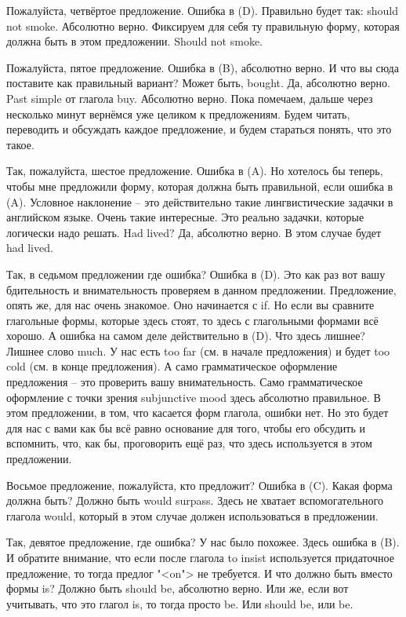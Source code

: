\documentclass[main.tex]{subfiles}
\begin{document}
Пожалуйста, четвёртое предложение.
Ошибка в (D).
Правильно будет так: should not smoke.
Абсолютно верно.
Фиксируем для себя ту правильную форму, которая должна быть в этом предложении.
Should not smoke.

Пожалуйста, пятое предложение.
Ошибка в (B), абсолютно верно.
И что вы сюда поставите как правильный вариант?
Может быть, bought.
Да, абсолютно верно.
Past simple от глагола buy.
Абсолютно верно.
Пока помечаем, дальше через несколько минут вернёмся уже целиком к предложениям.
Будем читать, переводить и обсуждать каждое предложение, и будем стараться понять, что это такое.

Так, пожалуйста, шестое предложение.
Ошибка в (A).
Но хотелось бы теперь, чтобы мне предложили форму, которая должна быть правильной, если ошибка в (A).
Условное наклонение -- это действительно такие лингвистические задачки в английском языке.
Очень такие интересные.
Это реально задачки, которые логически надо решать.
Had lived?
Да, абсолютно верно.
В этом случае будет had lived.

Так, в седьмом предложении где ошибка?
Ошибка в (D).
Это как раз вот вашу бдительность и внимательность проверяем в данном предложении.
Предложение, опять же, для нас очень знакомое.
Оно начинается с if.
Но если вы сравните глагольные формы, которые здесь стоят, то здесь с глагольными формами всё хорошо.
А ошибка на самом деле действительно в (D).
Что здесь лишнее?
Лишнее слово much.
У нас есть too far (см. в начале предложения) и будет too cold (см. в конце предложения).
А само грамматическое оформление предложения -- это проверить вашу внимательность.
Само грамматическое оформление с точки зрения subjunctive mood здесь абсолютно правильное.
В этом предложении, в том, что касается форм глагола, ошибки нет.
Но это будет для нас с вами как бы всё равно основание для того, чтобы его обсудить и вспомнить, что, как бы, проговорить ещё раз, что здесь используется в этом предложении.

Восьмое предложение, пожалуйста, кто предложит?
Ошибка в (C).
Какая форма должна быть?
Должно быть would surpass.
Здесь не хватает вспомогательного глагола would, который в этом случае должен использоваться в предложении.

Так, девятое предложение, где ошибка?
У нас было похожее.
Здесь ошибка в (B).
И обратите внимание, что если после глагола to insist используется придаточное предложение, то тогда предлог "<on"> не требуется.
И что должно быть вместо формы is?
Должно быть should be, абсолютно верно.
Или же, если вот учитывать, что это глагол is, то тогда просто be.
Или should be, или be.
\end{document}
